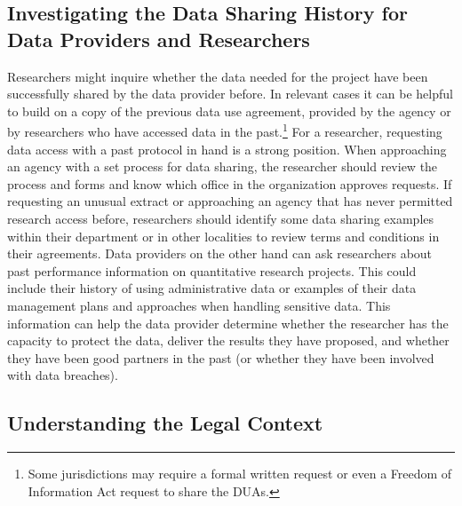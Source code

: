 
\hypertarget{investigating-the-data-sharing-history-for-data-providers-and-researchers}{%
\subsection{Investigating the Data Sharing History for Data Providers and Researchers}\label{investigating-the-data-sharing-history-for-data-providers-and-researchers}}

Researchers might inquire whether the data needed for the project have been successfully shared by the data provider before. In relevant cases it can be helpful to build on a copy of the previous data use agreement, provided by the agency or by researchers who have accessed data in the past.\footnote{Some jurisdictions may require a formal written request or even a Freedom of Information Act request to share the DUAs.} For a researcher, requesting data access with a past protocol in hand is a strong position. When approaching an agency with a set process for data sharing, the researcher should review the process and forms and know which office in the organization approves requests. If requesting an unusual extract or approaching an agency that has never permitted research access before, researchers should identify some data sharing examples within their department or in other localities to review terms and conditions in their agreements. Data providers on the other hand can ask researchers about past performance information on quantitative research projects. This could include their history of using administrative data or examples of their data management plans and approaches when handling sensitive data. This information can help the data provider determine whether the researcher has the capacity to protect the data, deliver the results they have proposed, and whether they have been good partners in the past (or whether they have been involved with data breaches).

\hypertarget{understanding-the-legal-context}{%
\subsection{Understanding the Legal Context}\label{understanding-the-legal-context}}

